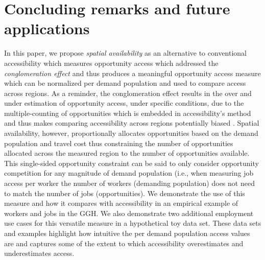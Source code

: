 \documentclass[]{elsarticle} %
\begin{document}
\hypertarget{concluding-remarks-and-future-applications}{%
\section{Concluding remarks and future
applications}\label{concluding-remarks-and-future-applications}}

In this paper, we propose \emph{spatial availability} as an alternative
to conventional accessibility which measures opportunity access which
addressed the \emph{conglomeration effect} and thus produces a
meaningful opportunity access measure which can be normalized per demand
population and used to compare access across regions. As a reminder, the
conglomeration effect results in the over and under estimation of
opportunity access, under specific conditions, due to the
multiple-counting of opportunities which is embedded in accessibility's
method and thus makes comparing accessibility across regions potentially
biased . Spatial availability, however, proportionally allocates
opportunities based on the demand population and travel cost thus
constraining the number of opportunities allocated across the measured
region to the number of opportunities available. This single-sided
opportunity constraint can be said to only consider opportunity
competition for any magnitude of demand population (i.e., when measuring
job access per worker the number of workers (demanding population) does
not need to match the number of jobs (opportunities). We demonstrate the
use of this measure and how it compares with accessibility in an
empirical example of workers and jobs in the GGH. We also demonstrate
two additional employment use cases for this versatile measure in a
hypothetical toy data set. These data sets and examples highlight how
intuitive the per demand population access values are and captures some
of the extent to which accessibility overestimates and underestimates
access.
\end{document}
